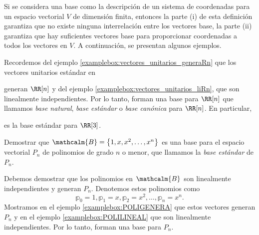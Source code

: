 Si se considera una base como la descripción de un sistema de coordenadas para un espacio vectorial $V$ de dimensión finita, entonces la parte (i) de esta definición garantiza que no existe ninguna interrelación entre los vectores base, la parte (ii) garantiza que hay suficientes vectores base para proporcionar coordenadas a todos los vectores en $V$. A continuación, se presentan algunos ejemplos.

\begin{examplebox}{}{}
    Recordemos del ejemplo \ref{examplebox:vectores_unitarios_generaRn} que los vectores unitarios estándar en
    \begin{matrizn}
    \end{matrizn}
    generan $\RR[n]$ y del ejemplo \ref{examplebox:vectores_unitarios_liRn}, que son linealmente independientes. Por lo tanto, forman una base para $\RR[n]$ que llamamos \emph{base natural}, \emph{base estándar} o \emph{base canónica} para $\RR[n]$. En particular,
    \begin{matrizn}
    \end{matrizn}
    es la base estándar para $\RR[3]$.
\end{examplebox}

\newpage

\begin{examplebox}{}{}
    Demostrar que $\mathcalm{B} = \left\{1, x, x^2, \dots, x^n\right\}$ es una base para el espacio vectorial $P_n$ de polinomios de grado $n$ o menor, que llamamos la \emph{base estándar} de $P_n$.
    
    \tcblower
    \solucion Debemos demostrar que los polinomios en $\mathcalm{B}$ son linealmente independientes y generan $P_n$. Denotemos estos polinomios como
    $$\mathbb{p}_0 = 1, \mathbb{p}_1 = x, \mathbb{p}_2 = x^2, \dots, \mathbb{p}_n = x^n.$$
    Mostramos en el ejemplo \ref{examplebox:POLIGENERA} que estos vectores generan $P_n$ y en el ejemplo \ref{examplebox:POLILINEAL} que son linealmente independientes. Por lo tanto, forman una base para $P_n$.
\end{examplebox}

